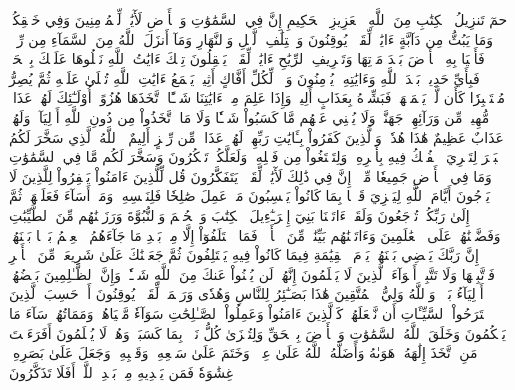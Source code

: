 حمٓ
تَنزِيلُ ٱلۡكِتَٰبِ مِنَ ٱللَّهِ ٱلۡعَزِيزِ ٱلۡحَكِيمِ
إِنَّ فِي ٱلسَّمَٰوَٰتِ وَٱلۡأَرۡضِ لَأٓيَٰتٖ لِّلۡمُؤۡمِنِينَ
وَفِي خَلۡقِكُمۡ وَمَا يَبُثُّ مِن دَآبَّةٍ ءَايَٰتٞ لِّقَوۡمٖ يُوقِنُونَ
وَٱخۡتِلَٰفِ ٱلَّيۡلِ وَٱلنَّهَارِ وَمَآ أَنزَلَ ٱللَّهُ مِنَ ٱلسَّمَآءِ مِن رِّزۡقٖ فَأَحۡيَا بِهِ ٱلۡأَرۡضَ بَعۡدَ مَوۡتِهَا وَتَصۡرِيفِ ٱلرِّيَٰحِ ءَايَٰتٞ لِّقَوۡمٖ يَعۡقِلُونَ
تِلۡكَ ءَايَٰتُ ٱللَّهِ نَتۡلُوهَا عَلَيۡكَ بِٱلۡحَقِّۖ فَبِأَيِّ حَدِيثِۭ بَعۡدَ ٱللَّهِ وَءَايَٰتِهِۦ يُؤۡمِنُونَ
وَيۡلٞ لِّكُلِّ أَفَّاكٍ أَثِيمٖ
يَسۡمَعُ ءَايَٰتِ ٱللَّهِ تُتۡلَىٰ عَلَيۡهِ ثُمَّ يُصِرُّ مُسۡتَكۡبِرٗا كَأَن لَّمۡ يَسۡمَعۡهَاۖ فَبَشِّرۡهُ بِعَذَابٍ أَلِيمٖ
وَإِذَا عَلِمَ مِنۡ ءَايَٰتِنَا شَيۡـًٔا ٱتَّخَذَهَا هُزُوًاۚ أُوْلَـٰٓئِكَ لَهُمۡ عَذَابٞ مُّهِينٞ
مِّن وَرَآئِهِمۡ جَهَنَّمُۖ وَلَا يُغۡنِي عَنۡهُم مَّا كَسَبُواْ شَيۡـٔٗا وَلَا مَا ٱتَّخَذُواْ مِن دُونِ ٱللَّهِ أَوۡلِيَآءَۖ وَلَهُمۡ عَذَابٌ عَظِيمٌ
هَٰذَا هُدٗىۖ وَٱلَّذِينَ كَفَرُواْ بِـَٔايَٰتِ رَبِّهِمۡ لَهُمۡ عَذَابٞ مِّن رِّجۡزٍ أَلِيمٌ
۞ٱللَّهُ ٱلَّذِي سَخَّرَ لَكُمُ ٱلۡبَحۡرَ لِتَجۡرِيَ ٱلۡفُلۡكُ فِيهِ بِأَمۡرِهِۦ وَلِتَبۡتَغُواْ مِن فَضۡلِهِۦ وَلَعَلَّكُمۡ تَشۡكُرُونَ
وَسَخَّرَ لَكُم مَّا فِي ٱلسَّمَٰوَٰتِ وَمَا فِي ٱلۡأَرۡضِ جَمِيعٗا مِّنۡهُۚ إِنَّ فِي ذَٰلِكَ لَأٓيَٰتٖ لِّقَوۡمٖ يَتَفَكَّرُونَ
قُل لِّلَّذِينَ ءَامَنُواْ يَغۡفِرُواْ لِلَّذِينَ لَا يَرۡجُونَ أَيَّامَ ٱللَّهِ لِيَجۡزِيَ قَوۡمَۢا بِمَا كَانُواْ يَكۡسِبُونَ
مَنۡ عَمِلَ صَٰلِحٗا فَلِنَفۡسِهِۦۖ وَمَنۡ أَسَآءَ فَعَلَيۡهَاۖ ثُمَّ إِلَىٰ رَبِّكُمۡ تُرۡجَعُونَ
وَلَقَدۡ ءَاتَيۡنَا بَنِيٓ إِسۡرَـٰٓءِيلَ ٱلۡكِتَٰبَ وَٱلۡحُكۡمَ وَٱلنُّبُوَّةَ وَرَزَقۡنَٰهُم مِّنَ ٱلطَّيِّبَٰتِ وَفَضَّلۡنَٰهُمۡ عَلَى ٱلۡعَٰلَمِينَ
وَءَاتَيۡنَٰهُم بَيِّنَٰتٖ مِّنَ ٱلۡأَمۡرِۖ فَمَا ٱخۡتَلَفُوٓاْ إِلَّا مِنۢ بَعۡدِ مَا جَآءَهُمُ ٱلۡعِلۡمُ بَغۡيَۢا بَيۡنَهُمۡۚ إِنَّ رَبَّكَ يَقۡضِي بَيۡنَهُمۡ يَوۡمَ ٱلۡقِيَٰمَةِ فِيمَا كَانُواْ فِيهِ يَخۡتَلِفُونَ
ثُمَّ جَعَلۡنَٰكَ عَلَىٰ شَرِيعَةٖ مِّنَ ٱلۡأَمۡرِ فَٱتَّبِعۡهَا وَلَا تَتَّبِعۡ أَهۡوَآءَ ٱلَّذِينَ لَا يَعۡلَمُونَ
إِنَّهُمۡ لَن يُغۡنُواْ عَنكَ مِنَ ٱللَّهِ شَيۡـٔٗاۚ وَإِنَّ ٱلظَّـٰلِمِينَ بَعۡضُهُمۡ أَوۡلِيَآءُ بَعۡضٖۖ وَٱللَّهُ وَلِيُّ ٱلۡمُتَّقِينَ
هَٰذَا بَصَـٰٓئِرُ لِلنَّاسِ وَهُدٗى وَرَحۡمَةٞ لِّقَوۡمٖ يُوقِنُونَ
أَمۡ حَسِبَ ٱلَّذِينَ ٱجۡتَرَحُواْ ٱلسَّيِّـَٔاتِ أَن نَّجۡعَلَهُمۡ كَٱلَّذِينَ ءَامَنُواْ وَعَمِلُواْ ٱلصَّـٰلِحَٰتِ سَوَآءٗ مَّحۡيَاهُمۡ وَمَمَاتُهُمۡۚ سَآءَ مَا يَحۡكُمُونَ
وَخَلَقَ ٱللَّهُ ٱلسَّمَٰوَٰتِ وَٱلۡأَرۡضَ بِٱلۡحَقِّ وَلِتُجۡزَىٰ كُلُّ نَفۡسِۭ بِمَا كَسَبَتۡ وَهُمۡ لَا يُظۡلَمُونَ
أَفَرَءَيۡتَ مَنِ ٱتَّخَذَ إِلَٰهَهُۥ هَوَىٰهُ وَأَضَلَّهُ ٱللَّهُ عَلَىٰ عِلۡمٖ وَخَتَمَ عَلَىٰ سَمۡعِهِۦ وَقَلۡبِهِۦ وَجَعَلَ عَلَىٰ بَصَرِهِۦ غِشَٰوَةٗ فَمَن يَهۡدِيهِ مِنۢ بَعۡدِ ٱللَّهِۚ أَفَلَا تَذَكَّرُونَ
